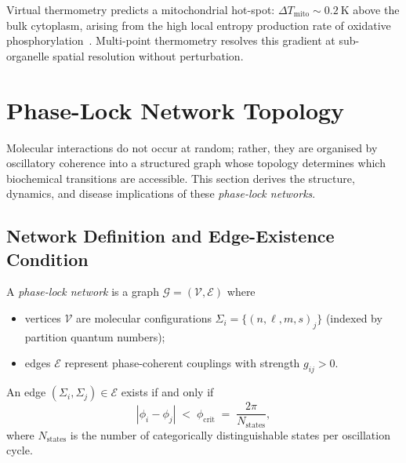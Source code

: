 \begin{corollary}
\label{cor:ch03-cell-gradients}
Virtual thermometry predicts a mitochondrial hot-spot:
$\Delta T_\mathrm{mito}\sim 0.2~\mathrm{K}$ above the bulk cytoplasm,
arising from the high local entropy production rate of oxidative
phosphorylation~\citep{Mitchell1961}.  Multi-point thermometry resolves this
gradient at sub-organelle spatial resolution without perturbation.
\end{corollary}

\section{Phase-Lock Network Topology}
\label{sec:ch03-phase-lock}

Molecular interactions do not occur at random; rather, they are organised by
oscillatory coherence into a structured graph whose topology determines which
biochemical transitions are accessible.  This section derives the structure,
dynamics, and disease implications of these \emph{phase-lock networks}.

\subsection{Network Definition and Edge-Existence Condition}

\begin{definition}
\label{def:ch03-pln}
A \emph{phase-lock network} is a graph $\mathcal{G}=(\mathcal{V},\mathcal{E})$
where
\begin{itemize}[nosep]
    \item vertices $\mathcal{V}$ are molecular configurations
          $\Sigma_i=\{(n,\ell,m,s)_j\}$ (indexed by partition quantum numbers);
    \item edges $\mathcal{E}$ represent phase-coherent couplings with strength
          $g_{ij}>0$.
\end{itemize}
\end{definition}

\begin{proposition}
\label{prop:ch03-edge-exist}
An edge $(\Sigma_i,\Sigma_j)\in\mathcal{E}$ exists if and only if
\begin{equation}
    |\phi_i-\phi_j| \;<\; \phi_{\mathrm{crit}}
    \;=\; \frac{2\pi}{N_{\mathrm{states}}},
    \label{eq:ch03-edge-crit}
\end{equation}
where $N_{\mathrm{states}}$ is the number of categorically distinguishable
states per oscillation cycle.
\end{proposition}

